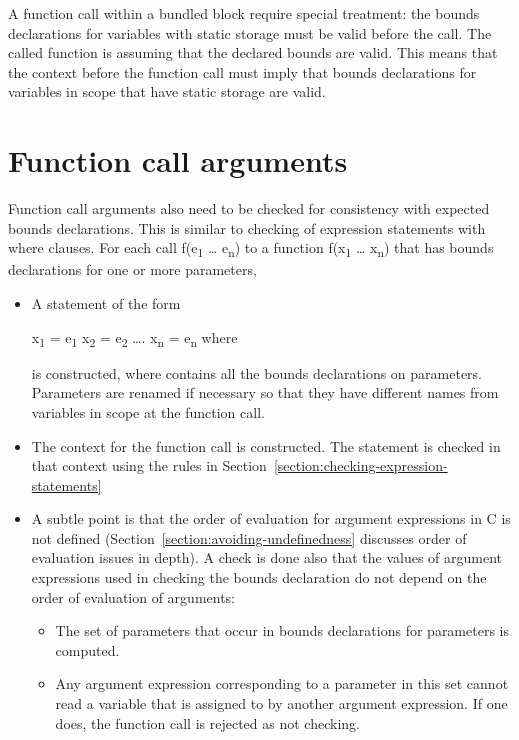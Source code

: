 A function call within a bundled block require special treatment: the
bounds declarations for variables with static storage must be valid
before the call. The called function is assuming that the declared
bounds are valid. This means that the context before the function call
must imply that bounds declarations for variables in scope that have
static storage are valid.

\section{Function call arguments}
\label{section:checking-function-call-arguments}

Function call arguments also need to be checked for consistency with
expected bounds declarations. This is similar to checking of expression
statements with where clauses. For each call f(e\textsubscript{1}
\ldots{} e\textsubscript{n}) to a function f(x\textsubscript{1} \ldots{}
x\textsubscript{n}) that has bounds declarations for one or more
parameters,

\begin{itemize}
\item
  A statement of the form

  x\textsubscript{1} = e\textsubscript{1} \code{,} x\textsubscript{2} = 
  e\textsubscript{2} \code{,} \ldots{}. x\textsubscript{n} =
  e\textsubscript{n} where \code{;}

  is constructed, where  contains all the bounds
  declarations on parameters. Parameters are renamed if necessary so
  that they have different names from variables in scope at the function
  call.
\item
  The context for the function call is constructed. The statement is
  checked in that context using the rules in 
  Section~\ref{section:checking-expression-statements}
\item
  A subtle point is that the order of evaluation for argument
  expressions in C is not defined (Section~\ref{section:avoiding-undefinedness}
  discusses order of
  evaluation issues in depth). A check is done also that the values of
  argument expressions used in checking the bounds declaration do not
  depend on the order of evaluation of arguments:

  \begin{itemize}
  \item
    The set of parameters that occur in bounds declarations for
    parameters is computed.
  \item
    Any argument expression corresponding to a parameter in this set
    cannot read a variable that is assigned to by another argument
    expression. If one does, the function call is rejected as not
    checking.
  \end{itemize}
\end{itemize}


